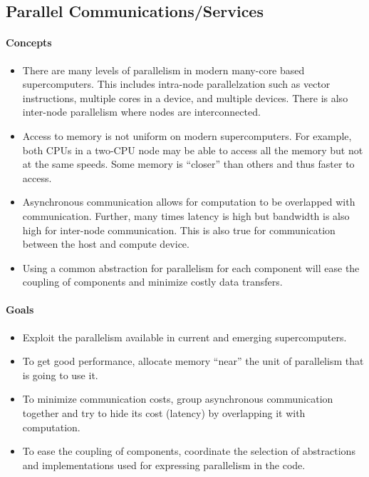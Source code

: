 \documentclass{article}
\begin{document}
\subsection{Parallel Communications/Services}

\paragraph{Concepts}
\begin{itemize}
  \item  There are many levels of parallelism in modern many-core based supercomputers.  This includes intra-node parallelzation such as vector instructions, multiple cores in a device, and multiple devices.
  There is also inter-node parallelism where nodes are interconnected.
  \item Access to memory is not uniform on modern supercomputers.  For example, both CPUs in a two-CPU node may be able to access all the memory but not at the same speeds.  Some memory is ``closer'' than others and thus faster to access.
  \item Asynchronous communication allows for computation to be overlapped with communication.
  Further, many times latency is high but bandwidth is also high for inter-node communication.  This is also true for communication between the host and compute device.
  \item Using a common abstraction for parallelism for each component will ease the coupling of components and minimize costly data transfers.
\end{itemize}

\paragraph{Goals}
\begin{itemize}
  \item Exploit the parallelism available in current and emerging supercomputers.
  \item To get good performance, allocate memory ``near'' the unit of parallelism that is going to use it.
  \item To minimize communication costs, group asynchronous communication together and try to hide its cost (latency) by overlapping it with computation.
  \item To ease the coupling of components, coordinate the selection of abstractions and implementations used for expressing parallelism in the code.
\end{itemize}
 
\end{document}
